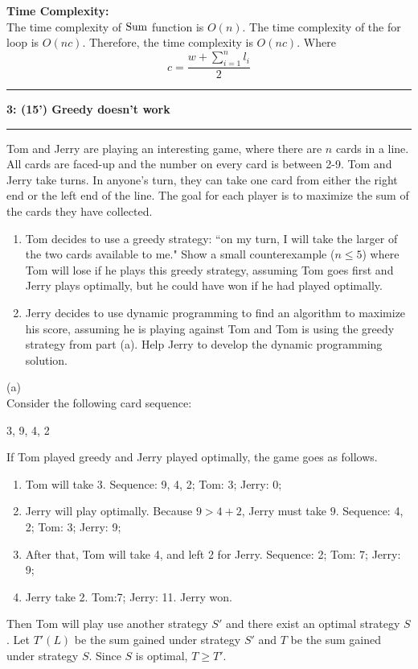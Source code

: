 \documentclass[10.5pt]{article}
\newcommand\question[2]{\vspace{.25in}\hrule\textbf{#1: #2}\vspace{.5em}\hrule\vspace{.10in}}
\newenvironment{main idea}{\textbf{Main Idea: }}{}
\newenvironment{complexity}{\textbf{Time Complexity: }\\}{}
\theoremstyle{remark}
\begin{document}
\begin{complexity}
	The time complexity of \(\textup{Sum}\) function is \(O(n)\).
	The time complexity of the for loop is \(O(nc)\).
	Therefore, the time complexity is \(O(nc)\). Where
	\[
		c = \frac{w + \sum_{i = 1}^n l_i}{2}
	\]
\end{complexity}
\pagebreak

\question{3}{(15') Greedy doesn't work}

Tom and Jerry are playing an interesting game, where there are $n$ cards in a line. All cards are faced-up and the number on every card is between 2-9. Tom and Jerry take turns. In anyone's turn, they can take one card from either the right end or the left end of the line. The goal for each player is to maximize the sum of the cards they have collected.

\begin{enumerate}
	\item[(a)] Tom decides to use a greedy strategy: ``on my turn, I will take the larger of the two cards available to me." Show a small counterexample ($n\leq 5$) where Tom will lose if he plays this greedy strategy, assuming Tom goes first and Jerry plays optimally, but he could have won if he had played optimally.
	\item[(b)] Jerry decides to use dynamic programming to find an algorithm to maximize his score, assuming he is playing against Tom and Tom is using the greedy strategy from part (a). Help Jerry to develop the dynamic programming solution.
\end{enumerate}
(a) \\
Consider the following card sequence:
\begin{center}
	3, 9, 4, 2
\end{center}
If Tom played greedy and Jerry played optimally, the game goes as follows.
\begin{enumerate}
	\item[(t1)] Tom will take 3. Sequence: 9, 4, 2; Tom: 3; Jerry: 0;
	\item[(t2)] Jerry will play optimally. Because \(9 > 4 + 2\), Jerry must take \(9\). Sequence: 4, 2; Tom: 3; Jerry: 9;
	\item[(t3)] After that, Tom will take 4, and left 2 for Jerry. Sequence: 2; Tom: 7; Jerry: 9;
	\item[(t4)] Jerry take 2. Tom:7; Jerry: 11. Jerry won.
\end{enumerate}
Then Tom will play use another strategy \(S'\) and there exist an optimal strategy \(S\). Let \(T'(L)\) be the sum gained under strategy \(S'\) and \(T\) be the sum gained under strategy \(S\). Since \(S\) is optimal, \(T \ge T'\).
\end{document}
